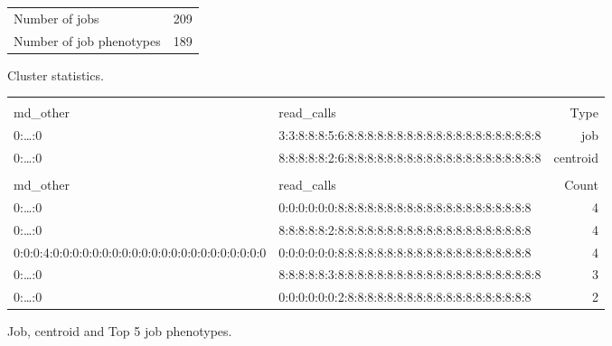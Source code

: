 \documentclass{jhps}
\begin{document}
\noindent\begin{minipage}{\textwidth}
\captionsetup{type=table}

\begingroup
  \begin{subtable}{\textwidth}
  \centering
  \begin{tabular}{ll}
    Number of jobs & 209 \\
    Number of job phenotypes & 189 \\
  \end{tabular}
  \caption{Cluster statistics.}
  \label{tab:use_case:hex_lev:stats}
  \end{subtable}
\endgroup

\medskip

\begingroup
  \begin{subtable}{\textwidth}
  \begin{tiny}
    \begin{tabular}{ll|r}
      \rowcolor{tblhead}
      \multicolumn{2}{l|}{Hexadecimal coding} & \\
      \rowcolor{tblhead}
      md\_other                                           &  read\_calls                                           & Type     \\
      \hline
      0:\dots:0                                           &  3:3:8:8:8:5:6:8:8:8:8:8:8:8:8:8:8:8:8:8:8:8:8:8:8:8:8 & job      \\
      0:\dots:0                                           &  8:8:8:8:8:2:6:8:8:8:8:8:8:8:8:8:8:8:8:8:8:8:8:8:8:8:8 & centroid \\
      \multicolumn{3}{l}{}                                \\
      \rowcolor{tblhead}      md\_other                                           &  read\_calls                                           & Count    \\
      \hline
      0:\dots:0                                           &  0:0:0:0:0:0:8:8:8:8:8:8:8:8:8:8:8:8:8:8:8:8:8:8:8:8   & 4        \\
      0:\dots:0                                           &  8:8:8:8:8:2:8:8:8:8:8:8:8:8:8:8:8:8:8:8:8:8:8:8:8:8   & 4        \\
      0:0:0:4:0:0:0:0:0:0:0:0:0:0:0:0:0:0:0:0:0:0:0:0:0:0 &  0:0:0:0:0:0:8:8:8:8:8:8:8:8:8:8:8:8:8:8:8:8:8:8:8:8   & 4        \\
      0:\dots:0                                           &  8:8:8:8:8:3:8:8:8:8:8:8:8:8:8:8:8:8:8:8:8:8:8:8:8:8:8 & 3        \\
      0:\dots:0                                           &  0:0:0:0:0:0:2:8:8:8:8:8:8:8:8:8:8:8:8:8:8:8:8:8:8:8   & 2        \\
    \end{tabular}
  \end{tiny}
  \caption{Job, centroid and Top 5 job phenotypes.}
  \label{tab:use_case:hex_lev:top_jobs}
  \end{subtable}
\endgroup


\end{minipage}
\end{document}
